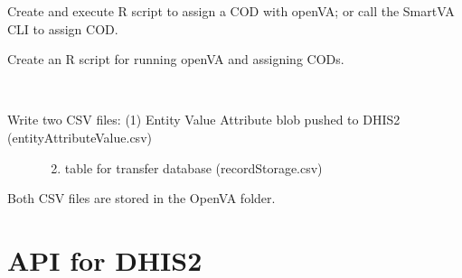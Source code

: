 \documentclass[letterpaper,12pt,english]{sphinxmanual}
\begin{document}
\begin{fulllineitems}
\begin{fulllineitems}
\end{fulllineitems}


\begin{fulllineitems}
\label{\detokenize{help:openVA.OpenVA.getCOD}}
Create and execute R script to assign a COD with openVA; or call the SmartVA CLI to assign COD.

\end{fulllineitems}


\begin{fulllineitems}
\label{\detokenize{help:openVA.OpenVA.rScript}}
Create an R script for running openVA and assigning CODs.

\end{fulllineitems}


\begin{fulllineitems}
\label{\detokenize{help:openVA.OpenVA.smartVA_to_csv}}~\begin{description}
\item[{Write two CSV files: (1) Entity Value Attribute blob pushed to DHIS2 (entityAttributeValue.csv)}] \leavevmode\begin{enumerate}
\setcounter{enumi}{1}
\item {} 
table for transfer database (recordStorage.csv)

\end{enumerate}

\end{description}

Both CSV files are stored in the OpenVA folder.

\end{fulllineitems}


\end{fulllineitems}



\section{API for DHIS2}
\label{\detokenize{help:api-for-dhis2}}
\end{document}
